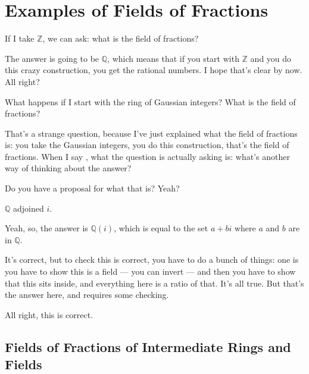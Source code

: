 \section{Examples of Fields of Fractions}

\begin{speech}[01:09:44 - 01:10:46]
If I take $\mathbb{Z}$,  we can ask: what is the field of fractions?

The answer is going to be $\mathbb{Q}$,  which means that if you start with $\mathbb{Z}$ and you do this crazy construction, you get the rational numbers. I hope that's clear by now. All right?

What happens if I start with the ring of Gaussian integers? What is the field of fractions? 

That's a strange question, because I've just explained what the field of fractions is: you take the Gaussian integers, you do this construction, that's the field of fractions. When I say , what the question is actually asking is: what's another way of thinking about the answer?

Do you have a proposal for what that is? Yeah?
\end{speech}

\begin{student}
$\mathbb{Q}$ adjoined $i$.
\end{student}

\begin{speech}[01:10:46 - 01:11:48]
Yeah, so, the answer is $\mathbb{Q}(i)$,  which is equal to the set $a + bi$ where $a$ and $b$ are in $\mathbb{Q}$.

It's correct, but to check this is correct, you have to do a bunch of things: one is you have to show this is a field --- you can invert --- and then you have to show that this sits inside, and everything here is a ratio of that. It's all true. But that's the answer here, and requires some checking.

All right, this is correct.
\end{speech}

\subsection{Fields of Fractions of Intermediate Rings and Fields}

